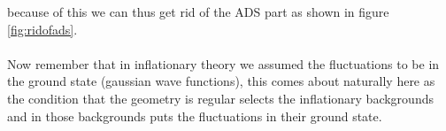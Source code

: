 \documentclass{article}
\begin{document}
  because of this we can thus get rid of the ADS part as shown in figure \ref{fig:ridofads}.\\\\
  Now remember that in inflationary theory we assumed the fluctuations to be in the ground state (gaussian wave functions), this comes about naturally here as the condition that the geometry is regular selects the inflationary backgrounds and in those backgrounds puts the fluctuations in their ground state.
\end{document}
